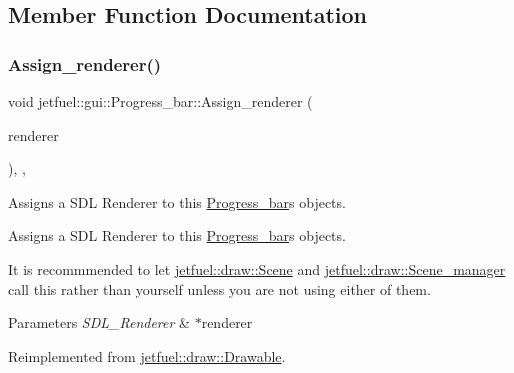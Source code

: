 \subsection{Member Function Documentation}
\mbox{\label{classjetfuel_1_1gui_1_1Progress__bar_a34797d42cedf5ff096eafb58c2e76128}} 
\subsubsection{\texorpdfstring{Assign\+\_\+renderer()}{Assign\_renderer()}}
{\footnotesize\ttfamily void jetfuel\+::gui\+::\+Progress\+\_\+bar\+::\+Assign\+\_\+renderer (\begin{DoxyParamCaption}\item[{S\+D\+L\+\_\+\+Renderer $\ast$}]{renderer }\end{DoxyParamCaption})\hspace{0.3cm}{\ttfamily [inline]}, {\ttfamily [override]}, {\ttfamily [virtual]}}



Assigns a S\+DL Renderer to this \hyperlink{classjetfuel_1_1gui_1_1Progress__bar}{Progress\+\_\+bar}\textquotesingle{}s objects. 

Assigns a S\+DL Renderer to this \hyperlink{classjetfuel_1_1gui_1_1Progress__bar}{Progress\+\_\+bar}\textquotesingle{}s objects.

It is recommmended to let \hyperlink{classjetfuel_1_1draw_1_1Scene}{jetfuel\+::draw\+::\+Scene} and \hyperlink{classjetfuel_1_1draw_1_1Scene__manager}{jetfuel\+::draw\+::\+Scene\+\_\+manager} call this rather than yourself unless you are not using either of them.


\begin{DoxyParams}{Parameters}
{\em S\+D\+L\+\_\+\+Renderer} & $\ast$renderer \\
\hline
\end{DoxyParams}


Reimplemented from \hyperlink{classjetfuel_1_1draw_1_1Drawable_a0d7257f197d6ffcdd89c3a99c93d1400}{jetfuel\+::draw\+::\+Drawable}.

\mbox{\label{classjetfuel_1_1gui_1_1Progress__bar_a91a7ffe82738105be9b36a48dca1cdec}} 
